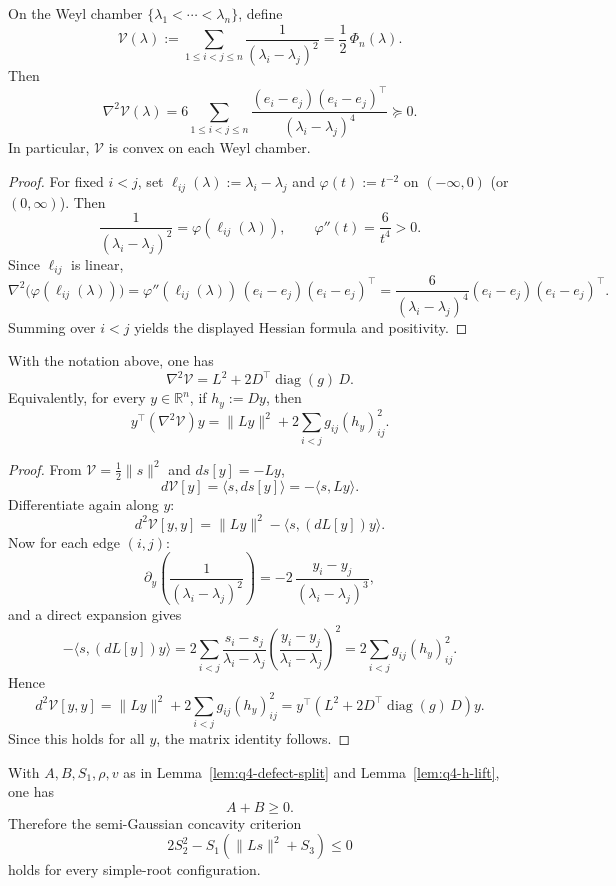 \begin{lemma}\label{lem:q4-convex-V}
On the Weyl chamber $\{\lambda_1<\cdots<\lambda_n\}$, define
\[
\mathcal V(\lambda):=\sum_{1\le i<j\le n}\frac{1}{(\lambda_i-\lambda_j)^2}
=\frac12\,\Phi_n(\lambda).
\]
Then
\[
\nabla^2\mathcal V(\lambda)
=
6\sum_{1\le i<j\le n}
\frac{(e_i-e_j)(e_i-e_j)^\top}{(\lambda_i-\lambda_j)^4}
\succeq 0.
\]
In particular, $\mathcal V$ is convex on each Weyl chamber.
\end{lemma}

\begin{proof}
For fixed $i<j$, set $\ell_{ij}(\lambda):=\lambda_i-\lambda_j$ and
$\varphi(t):=t^{-2}$ on $(-\infty,0)$ (or $(0,\infty)$).
Then
\[
\frac{1}{(\lambda_i-\lambda_j)^2}
=
\varphi(\ell_{ij}(\lambda)),
\qquad
\varphi''(t)=\frac{6}{t^4}>0.
\]
Since $\ell_{ij}$ is linear,
\[
\nabla^2\!\big(\varphi(\ell_{ij}(\lambda))\big)
=
\varphi''(\ell_{ij}(\lambda))\,(e_i-e_j)(e_i-e_j)^\top
=
\frac{6}{(\lambda_i-\lambda_j)^4}(e_i-e_j)(e_i-e_j)^\top.
\]
Summing over $i<j$ yields the displayed Hessian formula and positivity.
\end{proof}

\begin{lemma}\label{lem:q4-hessian-DLg}
With the notation above, one has
\[
\nabla^2\mathcal V
=
L^2+2D^\top\!\operatorname{diag}(g)\,D.
\]
Equivalently, for every $y\in\mathbb R^n$, if $h_y:=Dy$, then
\[
y^\top(\nabla^2\mathcal V)y
=
\|Ly\|^2+2\sum_{i<j} g_{ij}(h_y)_{ij}^2.
\]
\end{lemma}

\begin{proof}
From $\mathcal V=\frac12\|s\|^2$ and $ds[y]=-Ly$,
\[
d\mathcal V[y]=\langle s,ds[y]\rangle=-\langle s,Ly\rangle.
\]
Differentiate again along $y$:
\[
d^2\mathcal V[y,y]
=
\|Ly\|^2-\langle s,(dL[y])y\rangle.
\]
Now for each edge $(i,j)$:
\[
\partial_y\!\left(\frac{1}{(\lambda_i-\lambda_j)^2}\right)
=
-2\,\frac{y_i-y_j}{(\lambda_i-\lambda_j)^3},
\]
and a direct expansion gives
\[
-\langle s,(dL[y])y\rangle
=
2\sum_{i<j}\frac{s_i-s_j}{\lambda_i-\lambda_j}
\left(\frac{y_i-y_j}{\lambda_i-\lambda_j}\right)^2
=
2\sum_{i<j} g_{ij}(h_y)_{ij}^2.
\]
Hence
\[
d^2\mathcal V[y,y]
=
\|Ly\|^2+2\sum_{i<j} g_{ij}(h_y)_{ij}^2
=
y^\top\!\left(L^2+2D^\top\!\operatorname{diag}(g)\,D\right)y.
\]
Since this holds for all $y$, the matrix identity follows.
\end{proof}

\begin{proposition}\label{prop:q4-bottleneck-closed}
With $A,B,S_1,\rho,v$ as in Lemma~\ref{lem:q4-defect-split} and
Lemma~\ref{lem:q4-h-lift}, one has
\[
A+B\ge 0.
\]
Therefore the semi-Gaussian concavity criterion
\[
2S_2^2-S_1(\|Ls\|^2+S_3)\le 0
\]
holds for every simple-root configuration.
\end{proposition}

